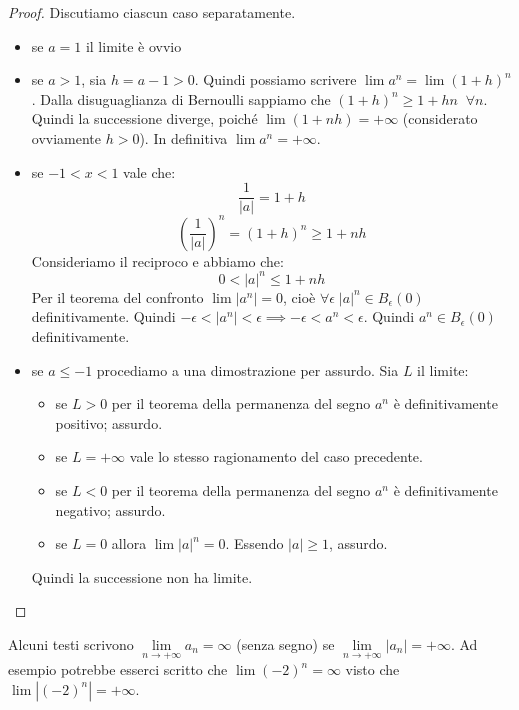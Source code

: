 \begin{proof}
Discutiamo ciascun caso separatamente.
\begin{itemize}
\item se $a=1$ il limite è ovvio
\item se $a>1$, sia $h = a - 1 > 0$. Quindi possiamo scrivere $\lim a^n = \lim (1+h)^n$. Dalla disuguaglianza di Bernoulli sappiamo che $(1+h)^n \ge 1 + hn \;\; \forall n$. Quindi la successione diverge, poiché $\lim (1 + nh) = +\infty$ (considerato ovviamente $h>0$). In definitiva $\lim a^n = +\infty$.

\item se $-1 < x < 1$ vale che:
\begin{equation*}
\frac{1}{|a|} = 1 + h
\end{equation*}
\begin{equation*}
\left(\frac{1}{|a|}\right)^n = (1+h)^n \ge 1 + nh
\end{equation*}
Consideriamo il reciproco e abbiamo che:
\begin{equation*}
0 < |a|^n \le 1 + nh
\end{equation*}
Per il teorema del confronto $\lim |a^n| = 0$, cioè $\forall \epsilon \; |a|^n \in B_{\epsilon}(0)$ definitivamente. Quindi $-\epsilon < |a^n| < \epsilon \implies -\epsilon < a^n < \epsilon$. Quindi $a^n \in B_{\epsilon}(0)$ definitivamente.

\item se $a \le -1$ procediamo a una dimostrazione per assurdo. Sia $L$ il limite:
\begin{itemize}
\item se $L > 0$ per il teorema della permanenza del segno $a^n$ è definitivamente positivo; assurdo.
\item se $L = +\infty$ vale lo stesso ragionamento del caso precedente.
\item se $L < 0$ per il teorema della permanenza del segno $a^n$ è definitivamente negativo; assurdo.
\item se $L = 0$ allora $\lim |a|^n = 0$. Essendo $|a| \ge 1$, assurdo.
\end{itemize}
Quindi la successione non ha limite.
\end{itemize}
\end{proof}

\begin{remark}
Alcuni testi scrivono $\lim\limits_{n \to +\infty} a_n = \infty$ (senza segno) se $\lim\limits_{n \to +\infty} |a_n| = +\infty$. Ad esempio potrebbe esserci scritto che $\lim (-2)^n = \infty$ visto che $\lim |(-2)^n| = +\infty$.
\end{remark}

